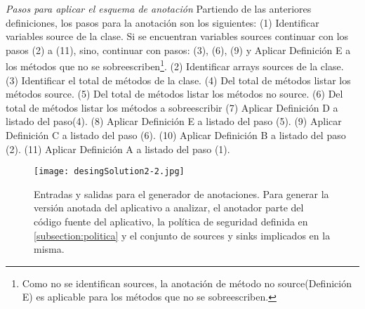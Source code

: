 \textit{Pasos para aplicar el esquema de anotación}\newline
\label{subsec:pasosSol}
Partiendo de las anteriores definiciones, los pasos para la anotación son los
siguientes:\newline
(1) Identificar variables source de la clase. Si se encuentran variables sources
continuar con los pasos (2) a (11), sino, continuar con pasos: (3), (6), (9) y
Aplicar Definición E a los métodos que no se sobreescriben\footnote{Como no se
identifican sources, la anotación de método no source(Definición E) es
aplicable para los métodos que no se sobreescriben.}.
(2) Identificar arrays sources de la clase.
(3) Identificar el total de métodos de la clase.\newline
(4) Del total de métodos listar los métodos source.\newline
(5) Del total de métodos listar los métodos no source.\newline
(6) Del total de métodos listar los métodos a sobreescribir\newline
(7) Aplicar Definición D a listado del paso(4).\newline
(8) Aplicar Definición E a listado del paso (5).\newline
(9) Aplicar Definición C a listado del paso (6).\newline
(10) Aplicar Definición B a listado del paso (2).\newline
(11) Aplicar Definición A a listado del paso (1).

\begin{figure}[t]
	\begin{center}
	\texttt{[image: desingSolution2-2.jpg]}
	\end{center}
	\caption{Entradas y salidas para el generador de anotaciones.\newline
	Para generar la versión anotada del aplicativo a analizar, el anotador parte
	del código fuente del aplicativo, la política de seguridad definida en
	\ref{subsection:politica} y el conjunto de sources y sinks implicados en la misma.}
	\label{fig:desingSolution}
\end{figure}

